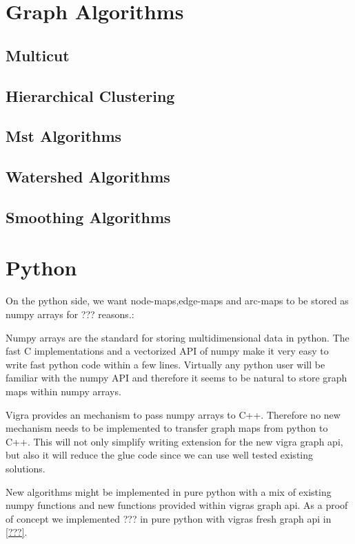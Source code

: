 
\section{Graph Algorithms}

    \subsection{Multicut}

    \subsection{Hierarchical Clustering}

    \subsection{Mst Algorithms}

    \subsection{Watershed Algorithms}

    \subsection{Smoothing Algorithms}





\section{Python}

On the python side, we want node-maps,edge-maps and arc-maps to be stored 
as numpy arrays for ??? reasons.:
\begin{compactitem}
    \item Numpy arrays are the standard for storing multidimensional data in python.
    The fast C implementations and a vectorized API of numpy make it very easy to write 
    fast python code within a few lines.
    Virtually any python user will be familiar with the numpy API and therefore it 
    seems to be natural to store graph maps within numpy arrays.
    \item Vigra provides an mechanism to pass numpy arrays to C++.
    Therefore no new mechanism needs to be implemented to transfer graph
    maps from python to C++.
    This will not only simplify writing extension for the new vigra graph api,
    but also it will reduce the glue code since we can use well tested existing
    solutions.
    \item New algorithms might be implemented in pure python with a mix of
    existing numpy functions and new functions provided within vigras graph api.
    As a proof of concept we implemented ??? in pure python with vigras
    fresh graph api in \cref{???}.
\end{compactitem}

